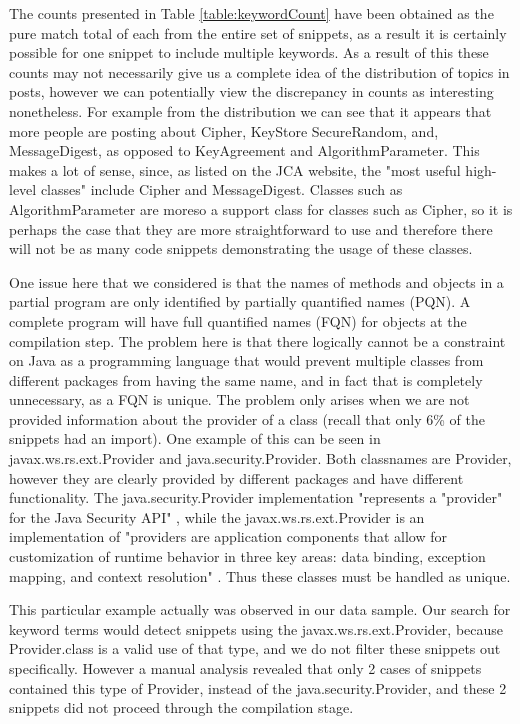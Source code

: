 \documentclass[10pt, conference]{IEEEtran}
\begin{document}
The counts presented in Table \ref{table:keywordCount} have been obtained as the pure match total of each from the entire set of snippets, as a result it is certainly possible for one snippet to include multiple keywords. As a result of this these counts may not necessarily give us a complete idea of the distribution of topics in posts, however we can potentially view the discrepancy in counts as interesting nonetheless. For example from the distribution we can see that it appears that more people are posting about Cipher, KeyStore SecureRandom, and, MessageDigest, as opposed to KeyAgreement and AlgorithmParameter. This makes a lot of sense, since, as listed on the JCA website, the "most useful high-level classes" include Cipher and MessageDigest. Classes such as AlgorithmParameter are moreso a support class for classes such as Cipher, so it is perhaps the case that they are more straightforward to use and therefore there will not be as many code snippets demonstrating the usage of these classes.
 

One issue here that we considered is that the names of methods and objects in a partial program are only identified by partially quantified names (PQN). A complete program will have full quantified names (FQN) for objects at the compilation step. The problem here is that there logically cannot be a constraint on Java as a programming language that would prevent multiple classes from different packages from having the same name, and in fact that is completely unnecessary, as a FQN is unique. The problem only arises when we are not provided information about the provider of a class (recall that only 6\% of the snippets had an import). One example of this can be seen in javax.ws.rs.ext.Provider and java.security.Provider. Both classnames are Provider, however they are clearly provided by different packages and have different functionality. The java.security.Provider implementation "represents a "provider" for the Java Security API" \cite{Security.Provider}, while the javax.ws.rs.ext.Provider is an implementation of "providers are application components that allow for customization of runtime behavior in three key areas: data binding, exception mapping, and context resolution" \cite{jax.Provider}. Thus these classes must be handled as unique. 

This particular example actually was observed in our data sample. Our search for keyword terms would detect snippets using the javax.ws.rs.ext.Provider, because Provider.class is a valid use of that type, and we do not filter these snippets out specifically. However a manual analysis revealed that only 2 cases of snippets contained this type of Provider, instead of the java.security.Provider, and these 2 snippets did not proceed through the compilation stage.
\end{document}
